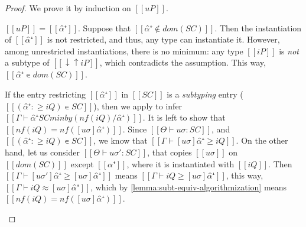 \lemMinInstCompleteness*
\begin{proof}
    We prove it by induction on $[[uP]]$.
    \begin{caseof}
        \item \label{case:min-inst-completeness-uvar} 
            $[[uP]] = [[α̂⁺]]$. Suppose that $[[α̂⁺ ∉ dom(SC)]]$.
            Then the instantiation of $[[α̂⁺]]$ is
            not restricted, and thus, any type can instantiate it.
            However, among unrestricted instantiations, there is no minimum:
            any type $[[iP]]$ is \emph{not} a subtype of $[[↓↑iP]]$,
            which contradicts the assumption.
            This way, $[[α̂⁺ ∊ dom(SC)]]$.

            If the entry restricting $[[α̂⁺]]$ in $[[SC]]$ is a \emph{subtyping} entry
            ($[[(α̂⁺ :≥ iQ) ∊ SC]]$), then 
            we apply  to infer 
            $[[Γ ⊢  α̂⁺ SC minby (nf(iQ) / α̂⁺)]]$.
            It is left to show that $[[ nf(iQ) = nf([uσ]α̂⁺) ]]$.
            Since $[[Θ ⊢ uσ : SC]]$, and $[[(α̂⁺ :≥ iQ) ∊ SC]]$, 
            we know that $[[Γ ⊢ [uσ]α̂⁺ ≥ iQ]]$. 
            On the other hand, let us consider $[[Θ ⊢ uσ' : SC]]$,
            that copies $[[uσ]]$ on $[[dom(SC)]]$ except $[[α̂⁺]]$,
            where it is instantiated with $[[iQ]]$.
            Then $[[Γ ⊢ [uσ']α̂⁺ ≥ [uσ]α̂⁺ ]]$ means $[[Γ ⊢ iQ ≥ [uσ]α̂⁺ ]]$,
            this way, $[[Γ ⊢ iQ ≈ [uσ]α̂⁺ ]]$, which by \cref{lemma:subt-equiv-algorithmization}
            means $[[nf(iQ) = nf([uσ]α̂⁺)]]$.


\end{caseof}
\end{proof}
